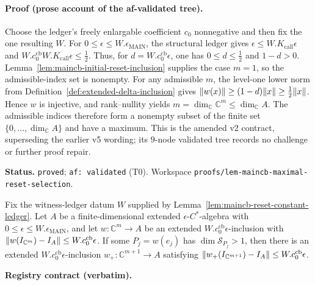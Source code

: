 \paragraph{Proof (prose account of the af-validated tree).}
Choose the ledger's freely enlargable coefficient $c_0$ nonnegative and then fix the one
resulting $W$.  For $0\leq\epsilon\leq W.\epsilon_{\mathrm{MAIN}}$, the structural ledger gives
$\epsilon\leq W.K_{\mathrm{call}}\epsilon$ and
$W.c^{\mathrm{cb}}_0W.K_{\mathrm{call}}\epsilon\leq\tfrac12$.  Thus, for
$d=W.c^{\mathrm{cb}}_0\epsilon$, one has $0\leq d\leq\tfrac12$ and $1-d>0$.
Lemma~\ref{lem:maincb-initial-reset-inclusion} supplies the case $m=1$, so the
admissible-index set is nonempty.  For any admissible $m$, the level-one lower norm from
Definition~\ref{def:extended-delta-inclusion} gives
$\lVert w(x)\rVert\geq(1-d)\lVert x\rVert\geq\tfrac12\lVert x\rVert$.  Hence $w$ is injective, and
rank--nullity yields
$m=\dim_{\mathbb C}\mathbb C^m\leq\dim_{\mathbb C}A$.  The admissible indices therefore form
a nonempty subset of the finite set $\{0,\ldots,\dim_{\mathbb C}A\}$ and have a maximum.
This is the
amended v2 contract, superseding the earlier v5 wording; its $9$-node validated tree records no
challenge or further proof repair.

\medskip\noindent\textbf{Status.} \texttt{proved}; \texttt{af: validated} (T0).  Workspace
\texttt{proofs/lem-maincb-maximal-reset-selection}.

\begin{lemma}\label{lem:maincb-stage1-strict-refinement}
Fix the witness-ledger datum $W$ supplied by Lemma~\ref{lem:maincb-reset-constant-ledger}.  Let $A$
be a finite-dimensional extended $\epsilon$-$C^*$-algebra with
$0\leq\epsilon\leq W.\epsilon_{\mathrm{MAIN}}$, and let $w:\mathbb C^m\to A$ be an extended
$W.c^{\mathrm{cb}}_0\epsilon$-inclusion with
$\lVert w(I_{\mathbb C^m})-I_A\rVert\leq W.c^{\mathrm{cb}}_0\epsilon$.  If some
$P_j=w(e_j)$ has $\dim\mathcal S_{P_j}>1$, then there is an extended
$W.c^{\mathrm{cb}}_0\epsilon$-inclusion $w_+:\mathbb C^{m+1}\to A$ satisfying
$\lVert w_+(I_{\mathbb C^{m+1}})-I_A\rVert\leq W.c^{\mathrm{cb}}_0\epsilon$.
\end{lemma}

\noindent\textbf{Registry contract (verbatim).}

